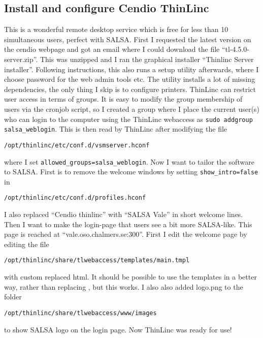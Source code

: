 \subsection{Install and configure Cendio ThinLinc}
This is a wonderful remote desktop service which is free for less than 10
simultaneous users, perfect with SALSA. First I requested the latest version on
the cendio webpage and got an email where I could download the file
“tl-4.5.0-server.zip”. This was unzipped and I ran the graphical installer
“Thinlinc Server installer”. Following instructions, this also runs a setup
utility afterwards, where I choose password for the web admin tools etc. The
utility installs a lot of missing dependencies, the only thing I skip is to
configure printers.  ThinLinc can restrict user access in terms of groups. It
is easy to modify the group membership of users via the cronjob script, so I
created a group where I place the current user(s) who can login to the computer
using the ThinLinc webaccess as \verb!sudo addgroup salsa_weblogin!. This is
then read by ThinLinc after modifying the file
\begin{verbatim}
/opt/thinlinc/etc/conf.d/vsmserver.hconf
\end{verbatim}
where I set
\verb!allowed_groups=salsa_weblogin!.  Now I want to tailor the software to
SALSA. First is to remove the welcome windows by setting
\verb!show_intro=false! in 
\begin{verbatim}
/opt/thinlinc/etc/conf.d/profiles.hconf
\end{verbatim}
I also replaced “Cendio thinlinc” with “SALSA Vale” in short welcome lines.
Then I want to make the login-page that users see a bit more SALSA-like. This
page is reached at “vale.oso.chalmers.se:300”. First I edit the welcome page by
editing the file
\begin{verbatim}
/opt/thinlinc/share/tlwebaccess/templates/main.tmpl
\end{verbatim}
with custom replaced html. It should be possible to use the templates in a
better way, rather than replacing , but this works. I also also added logo.png
to the folder
\begin{verbatim}
/opt/thinlinc/share/tlwebaccess/www/images
\end{verbatim}
to show SALSA logo on the login page. Now ThinLinc was ready for use!

